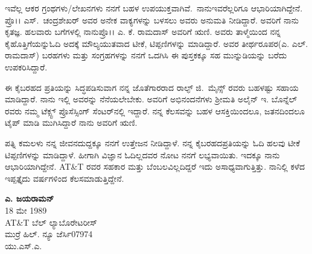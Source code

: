 ಇವೆಲ್ಲ ಆಕರ ಗ್ರಂಥಗಳು/ಲೇಖನಗಳು ನನಗೆ ಬಹಳ ಉಪಯುಕ್ತವಾಗಿವೆ.~ನಾನು\break  ಇವರೆಲ್ಲರಿಗೂ ಆಭಾರಿಯಾಗಿದ್ದೇನೆ. ಪ್ರೊ।। ಎಸ್.~ಚಂದ್ರಶೇಖರ್ ಅವರ ಅನೇಕ ವಾಕ್ಯಗಳನ್ನು ಬಳಸಲು ಅವರು ಅನುಮತಿ ನೀಡಿದ್ದಾರೆ. ಅವರಿಗೆ ನಾನು ಕೃತಜ್ಞ. ಹಲವಾರು ಬಗೆಗಳಲ್ಲಿ ನಾನು\break ಪ್ರೊ।। ಎ. ಕೆ. ರಾಮದಾಸ್ ಅವರಿಗೆ ಋಣಿ. ಅವರು ತಾಳ್ಮೆಯಿಂದ ನನ್ನ ಕೈಹೊತ್ತಿಗೆಯನ್ನು\break ಓದಿ ಅದಕ್ಕೆ ಮೌಲ್ಯಯುತವಾದ ಟೀಕೆ, ಟಿಪ್ಪಣಿಗಳನ್ನು ಮಾಡಿದ್ದಾರೆ. ಅವರ ತೀರ್ಥರೂಪರ\break (ಎ. ಎಲ್. ರಾಮದಾಸ್) ಬರಹಗಳು ಮತ್ತು ಸಂಗ್ರಹಗಳನ್ನು ನನಗೆ ಒದಗಿಸಿ ಈ ಪುಸ್ತಕಕ್ಕೂ ಸಹ ಮುನ್ನುಡಿಯನ್ನು ಬರೆದು ಉಪಕರಿಸಿದ್ದಾರೆ.

\eject

ಈ ಕೈಬರಹದ ಪ್ರತಿಯನ್ನು ಸಿದ್ಧಪಡಿಸುವಾಗ ನನ್ನ ಜೊತೆಗಾರರಾದ ರಾಲ್ಫ್ ಜಿ.~ಮೈನ್ಸ್ ರವರು ಬಹಳಷ್ಟು ಸಹಾಯ ಮಾಡಿದ್ದಾರೆ. ನಾನು ಇಲ್ಲಿ ಅವರನ್ನು ನೆನೆಯಲೇಬೇಕು. ಅವರಿಗೆ ಅಭಿನಂದನೆಗಳು ಶ್ರೀಮತಿ ಅಲೈನ್ ಇ. ಬೊನ್ನೆಲ್ ರವರು ನಮ್ಮ ಟೆಕ್ಸ್ಟ್ ಪ್ರೊಸೆಸ್ಸಿಂಗ್ ಸೆಂಟರ್‌ನಲ್ಲಿ ಇದ್ದಾರೆ. ನನ್ನ ಕೆಲಸವನ್ನು ಬಹಳ ಆಸಕ್ತಿಯಿಂದಲೂ, ಜತನದಿಂದಲೂ ಟೈಪ್ ಮಾಡಿ ಮುಗಿಸಿದ್ದಾರೆ ನಾನು ಅವರಿಗೆ ಋಣಿ.

\medskip

ಪತ್ನಿ ಕಮಲಳು ನನ್ನ ಜೀವನದುದ್ದಕ್ಕೂ ನನಗೆ ಉತ್ತೇಜನ ನೀಡಿದ್ದಾಳೆ. ನನ್ನ ಕೈಬರಹದ\break ಪ್ರತಿಯನ್ನು ಓದಿ ಹಲವು ಟೀಕೆ ಟಿಪ್ಪಣಿಗಳನ್ನು ಮಾಡಿದ್ದಾಳೆ. ಹೀಗಾಗಿ ವಿಜ್ಞಾನ ಓದಿಲ್ಲದವರ ನೋಟ ನನಗೆ ಲಭ್ಯವಾಯಿತು. ಇದಕ್ಕೂ ನಾನು ಆಭಾರಿಯಾಗಿದ್ದೇನೆ. AT\&T ರವರ ಸಹಕಾರ ಮತ್ತು ಬೆಂಬಲವಿಲ್ಲದಿದ್ದರೆ ಇದು ಅಸಾಧ್ಯವಾಗುತ್ತಿತ್ತು. ನಾನಿಲ್ಲಿ ಕಳೆದ ಇಪ್ಪತ್ತೈದು ವರ್ಷಗಳಿಂದ ಕೆಲಸ\break ಮಾಡುತ್ತಿದ್ದೇನೆ.

\begin{flushright}
\textbf{ಎ. ಜಯರಾಮನ್}\\
18 ಮೇ 1989\\
AT\&T ಬೆಲ್ ಲ್ಯಾಬೊರೇಟರೀಸ್\\
ಮುರ್ರೆ ಹಿಲ್. ನ್ಯೂ ಜೆರ್ಸಿ\enginline{-}07974\\
ಯು.ಎಸ್.ಎ.
\end{flushright}
